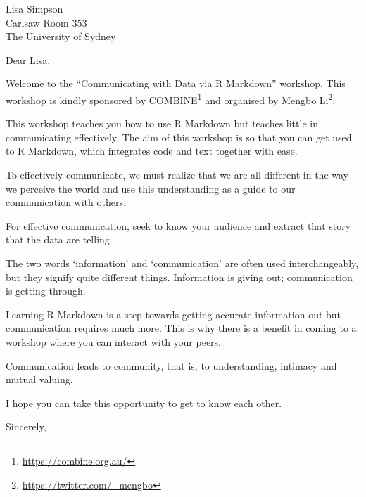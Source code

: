 \documentclass[11pt,]{letter}
\date{4th October 2019}
\renewcommand{\href}[2]{#2\footnote{\url{#1}}}
\renewenvironment{quote}{\begin{blockquote}\list{}{\rightmargin=0em\leftmargin=0em}%
\item\relax\color{greytext}\ignorespaces}{\unskip\unskip\endlist\end{blockquote}}
\begin{document}
\begin{letter}{Lisa Simpson\\
Carlsaw Room 353\\
The University of Sydney\\}
\opening{Dear Lisa,}

Welcome to the ``Communicating with Data via R Markdown'' workshop. This
workshop is kindly sponsored by \href{https://combine.org.au/}{COMBINE}
and organised by \href{https://twitter.com/_mengbo}{Mengbo Li}.

This workshop teaches you how to use R Markdown but teaches little in
communicating effectively. The aim of this workshop is so that you can
get used to R Markdown, which integrates code and text together with
ease.

\begin{quote}
To effectively communicate, we must realize that we are all different in
the way we perceive the world and use this understanding as a guide to
our communication with others.
\end{quote}

For effective communication, seek to know your audience and extract that
story that the data are telling.

\begin{quote}
The two words `information' and `communication' are often used
interchangeably, but they signify quite different things. Information is
giving out; communication is getting through.
\end{quote}

Learning R Markdown is a step towards getting accurate information out
but communication requires much more. This is why there is a benefit in
coming to a workshop where you can interact with your peers.

\begin{quote}
Communication leads to community, that is, to understanding, intimacy
and mutual valuing.
\end{quote}

I hope you can take this opportunity to get to know each other.

\longindentation=0pt
\closing{Sincerely,}

\end{letter}
\end{document}
